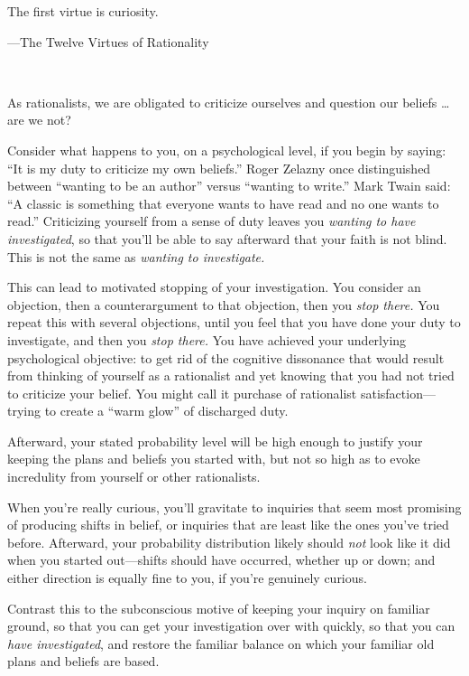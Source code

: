 {
 The first virtue is curiosity.}

{\raggedleft
 {}---The Twelve Virtues of Rationality
\par}


\bigskip

{
 ~}

{
 As rationalists, we are obligated to criticize ourselves and
question our beliefs \ldots are we not?}

{
 Consider what happens to you, on a psychological level, if you
begin by saying: ``It is my duty to criticize my own
beliefs.'' Roger Zelazny once distinguished between
``wanting to be an author'' versus
``wanting to write.'' Mark Twain
said: ``A classic is something that everyone wants to
have read and no one wants to read.'' Criticizing
yourself from a sense of duty leaves you \textit{wanting to have
investigated}, so that you'll be able to say afterward
that your faith is not blind. This is not the same as \textit{wanting
to investigate.}}

{
 This can lead to motivated stopping of your investigation. You
consider an objection, then a counterargument to that objection, then
you \textit{stop there.} You repeat this with several objections, until
you feel that you have done your duty to investigate, and then you
\textit{stop there.} You have achieved your underlying psychological
objective: to get rid of the cognitive dissonance that would result
from thinking of yourself as a rationalist and yet knowing that you had
not tried to criticize your belief. You might call it purchase of
rationalist satisfaction---trying to create a ``warm
glow'' of discharged duty.}

{
 Afterward, your stated probability level will be high enough to
justify your keeping the plans and beliefs you started with, but not so
high as to evoke incredulity from yourself or other rationalists.}

{
 When you're really curious, you'll
gravitate to inquiries that seem most promising of producing shifts in
belief, or inquiries that are least like the ones
you've tried before. Afterward, your probability
distribution likely should \textit{not} look like it did when you
started out---shifts should have occurred, whether up or down; and
either direction is equally fine to you, if you're
genuinely curious.}

{
 Contrast this to the subconscious motive of keeping your inquiry
on familiar ground, so that you can get your investigation over with
quickly, so that you can \textit{have investigated}, and restore the
familiar balance on which your familiar old plans and beliefs are
based.}

